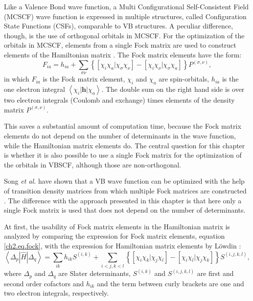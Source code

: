 Like a Valence Bond wave function, a Multi Configurational Self-Consistent Field (MCSCF) \cite{joop,mcscf,roos1,roos2} wave function is expressed in multiple structures, called Configuration State Functions (CSFs), comparable to VB structures. A peculiar difference, though, is the use of orthogonal orbitals in MCSCF. For the optimization of the orbitals in MCSCF, elements from a single Fock matrix are used to construct  elements of the Hamiltonian matrix \cite{roos1}. The Fock matrix elements have the form:
\begin{equation}
F_{ia} = h_{ia} + \sum_{\sigma\nu} \left\{ \left[ \chi_i \chi_a | \chi_\sigma \chi_\nu \right] - \left[ \chi_i \chi_\nu | \chi_\sigma \chi_a \right] \right\} P^{(\sigma,\nu)},
\label{ch2.eq.fock}
\end{equation}
in which $F_{ia}$ is the Fock matrix element, $\chi_i$ and $\chi_a$ are spin-orbitals, $h_{ia}$ is the one electron integral $\left< \chi_i | \mathbf{h}| \chi_a \right>$. The double sum on the right hand side is over two electron integrals (Coulomb and exchange) times elements of the density matrix $P^{(\sigma,\nu)}$. 

This saves a substantial amount of computation time, because the Fock matrix elements do not depend on the number of determinants in the wave function, while the Hamiltonian matrix elements do. The central question for this chapter is whether it is also possible to use a single Fock matrix for the optimization of the orbitals in VBSCF, although those are non-orthogonal.

Song \textit{et al.} have shown that a VB wave function can be optimized with the help of transition density matrices from which multiple Fock matrices are constructed \cite{song}. The difference with the approach presented in this chapter is that here only a single Fock matrix is used that does not depend on the number of determinants.
 
At first, the usability of Fock matrix elements in the Hamiltonian matrix is analyzed by comparing the expression for Fock matrix elements, equation \ref{ch2.eq.fock}, with the expression for Hamiltonian matrix elements by L\"{o}wdin \cite{lowdin}:
\begin{equation}
\left< \Delta_p | \hat{H} | \Delta_q \right> = \sum_{ik} h_{ik}S^{(i,k)} + \sum_{i<j,k<l} \left\{ \left[ \chi_i \chi_k | \chi_j \chi_l \right] - \left[ \chi_i \chi_l | \chi_j \chi_k \right] \right\}S^{(i,j,k,l)},
\label{ch2.eq.lowdindeterminants}
\end{equation}
where $\Delta_p$ and $\Delta_q$ are Slater determinants, $S^{(i,k)}$ and $S^{(i,j,k,l)}$ are first and second order cofactors and $h_{ik}$ and the term between curly brackets are one and two electron integrals, respectively.


